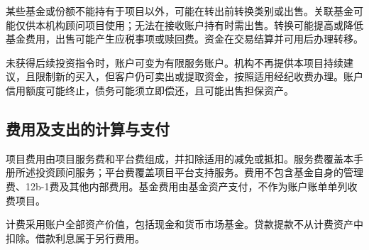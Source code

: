 \documentclass[UTF8,fontset=none,11pt,a4paper]{ctexart}
\begin{document}
某些基金或份额不能持有于项目以外，可能在转出前转换类别或出售。关联基金可能仅供本机构顾问项目使用；无法在接收账户持有时需出售。转换可能提高或降低基金费用，出售可能产生应税事项或赎回费。资金在交易结算并可用后\allowbreak\mbox{办理转移。}


未获得后续投资指令时，账户可变为有限服务账户。机构不再提供本项目持续建议，且限制新的买入，但客户仍可卖出或提取资金，按照适用经纪收费办理。账户信用额度可能终止，债务可能须立即偿还，且可能出售\allowbreak\mbox{担保资产。}


\subsection*{费用及支出的计算与支付}
项目费用由项目服务费和平台费组成，并扣除适用的减免或抵扣。服务费覆盖本手册所述投资顾问服务；平台费覆盖项目平台支持服务。费用不包含基金自身的管理费、12b-1费及其他内部费用。基金费用由基金资产支付，不作为账户账单单列\allowbreak\mbox{收费项目。}


计费采用账户全部资产价值，包括现金和货币市场基金。贷款提款不从计费资产中扣除。借款利息属于\allowbreak\mbox{另行费用。}
\end{document}
